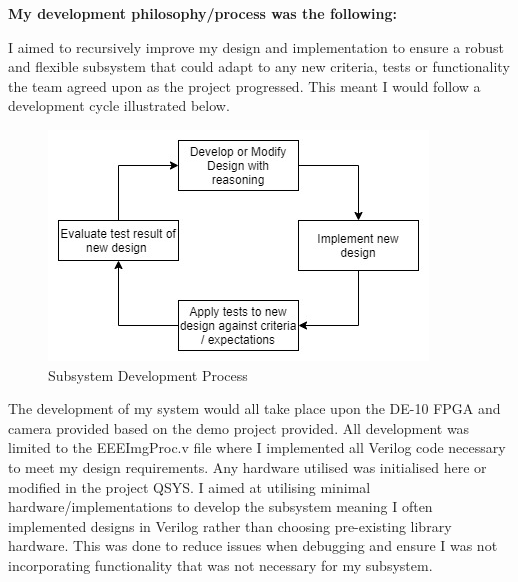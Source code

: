 \documentclass[10pt,twoside]{article}
\begin{document}
\textbf{My development philosophy/process was the following:}

I aimed to recursively improve my design and implementation to ensure a robust and flexible subsystem that could adapt to any new criteria, tests or functionality the team agreed upon as the project progressed. This meant I would follow a development cycle illustrated below.

\begin{figure}[hbt!]
    \centering
    \includegraphics[scale=0.60]{FlowOfDesign.jpg}
    \captionsetup{justification=centering}
    \caption{Subsystem Development Process}
\end{figure}

The development of my system would all take place upon the DE-10 FPGA and camera provided based on the demo project provided. All development was limited to the EEEImgProc.v file where I implemented all Verilog code necessary to meet my design requirements. Any hardware utilised was initialised here or modified in the project QSYS. I aimed at utilising minimal hardware/implementations to develop the subsystem meaning I often implemented designs in Verilog rather than choosing pre-existing library hardware. This was done to reduce issues when debugging and ensure I was not incorporating functionality that was not necessary for my subsystem.




\newpage
\end{document}
